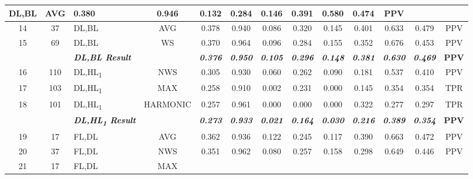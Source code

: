 \begin{table}[H]
{\begin{tabular}{cc|l|c|c|c|c|c|c|c|c|c|c|}
    DL,BL &
    AVG &
    0.380 &
    0.946 &
    0.132 &
    0.284 &
    0.146 &
    0.391 &
    0.580 &
    0.474 &
    PPV \\ \hline
  \multicolumn{1}{|c|}{14} &
    37 &
    DL,BL &
    AVG &
    0.378 &
    0.940 &
    0.086 &
    0.320 &
    0.145 &
    0.401 &
    0.633 &
    0.479 &
    PPV \\ \hline
  \multicolumn{1}{|c|}{15} &
    69 &
    DL,BL &
    WS &
    0.370 &
    0.964 &
    0.096 &
    0.284 &
    0.155 &
    0.352 &
    0.676 &
    0.453 &
    PPV \\ \hline
  \textbf{} &
    \textit{\textbf{}} &
    \textit{\textbf{DL,BL Result}} &
    \textbf{} &
    \textit{\textbf{0.376}} &
    \textit{\textbf{0.950}} &
    \textit{\textbf{0.105}} &
    \textit{\textbf{0.296}} &
    \textit{\textbf{0.148}} &
    \textit{\textbf{0.381}} &
    \textit{\textbf{0.630}} &
    \textit{\textbf{0.469}} &
    \textbf{PPV} \\ \hline
  \multicolumn{1}{|c|}{16} &
    110 &
    DL,HL\textsubscript{1} &
    NWS &
    0.305 &
    0.930 &
    0.060 &
    0.262 &
    0.090 &
    0.181 &
    0.537 &
    0.410 &
    PPV \\ \hline
  \multicolumn{1}{|c|}{17} &
    103 &
    DL,HL\textsubscript{1} &
    MAX &
    0.258 &
    0.910 &
    0.002 &
    0.231 &
    0.000 &
    0.145 &
    0.354 &
    0.354 &
    TPR \\ \hline
  \multicolumn{1}{|c|}{18} &
    101 &
    DL,HL\textsubscript{1} &
    HARMONIC &
    0.257 &
    0.961 &
    0.000 &
    0.000 &
    0.000 &
    0.322 &
    0.277 &
    0.297 &
    TPR \\ \hline
  \textbf{} &
    \textit{\textbf{}} &
    \textit{\textbf{DL,HL\textsubscript{1} Result}} &
    \textbf{} &
    \textit{\textbf{0.273}} &
    \textit{\textbf{0.933}} &
    \textit{\textbf{0.021}} &
    \textit{\textbf{0.164}} &
    \textit{\textbf{0.030}} &
    \textit{\textbf{0.216}} &
    \textit{\textbf{0.389}} &
    \textit{\textbf{0.354}} &
    \textbf{PPV} \\ \hline
  \multicolumn{1}{|c|}{19} &
    17 &
    FL,DL &
    AVG &
    0.362 &
    0.936 &
    0.122 &
    0.245 &
    0.117 &
    0.390 &
    0.663 &
    0.472 &
    PPV \\ \hline
  \multicolumn{1}{|c|}{20} &
    37 &
    FL,DL &
    NWS &
    0.351 &
    0.962 &
    0.080 &
    0.257 &
    0.158 &
    0.298 &
    0.649 &
    0.446 &
    PPV \\ \hline
  \multicolumn{1}{|c|}{21} &
    17 &
    FL,DL &
    MAX &

\end{tabular}}
\end{table}
